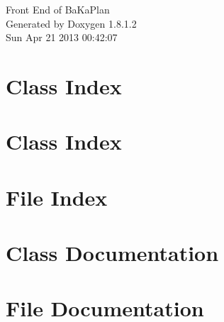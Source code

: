\documentclass{book}
\begin{document}
\hypersetup{pageanchor=false,citecolor=blue}
\begin{titlepage}
\vspace*{7cm}
\begin{center}
{\Large Front End of Ba\-Ka\-Plan }\\
\vspace*{1cm}
{\large Generated by Doxygen 1.8.1.2}\\
\vspace*{0.5cm}
{\small Sun Apr 21 2013 00:42:07}\\
\end{center}
\end{titlepage}
\clearemptydoublepage
{}
\tableofcontents
\clearemptydoublepage
{}
\hypersetup{pageanchor=true,citecolor=blue}
\chapter{Class Index}

\chapter{Class Index}

\chapter{File Index}

\chapter{Class Documentation}






















\chapter{File Documentation}


































\printindex
\end{document}
